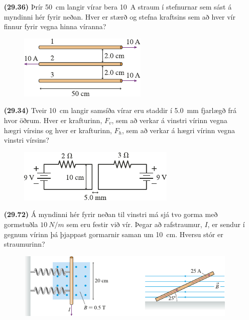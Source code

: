 \ifdefined \wholebook \else\documentclass[oneside]{book}\usepackage{EdlBook}\graphicspath{{figures/}}
\begin{document}
\begin{enumerate}[label = \textbf{(\alph*)}]

\item[\textbf{(29.36)}] Þrír \SI{50}{cm} langir vírar bera \SI{10}{A} straum í stefnurnar sem sást á myndinni hér fyrir neðan. Hver er stærð og stefna kraftsins sem að hver vír finnur fyrir vegna hinna víranna?

\begin{figure}[H]
    \centering
    \includegraphics[scale = 1.25]{figures/rk2936.pdf}
\end{figure}

\item[\textbf{(29.34)}] Tveir \SI{10}{cm} langir samsíða vírar eru staddir í \SI{5.0}{mm} fjarlægð frá hvor öðrum. Hver er krafturinn, $F_v$, sem að verkar á vinstri vírinn vegna hægri vírsins og hver er krafturinn, $F_h$, sem að verkar á hægri vírinn vegna vinstri vírsins? 

\begin{figure}[H]
    \centering
    \includegraphics[scale = 1.25]{figures/rk2934.pdf}
\end{figure}

\item[\textbf{(29.72)}] Á myndinni hér fyrir neðan til vinstri má sjá tvo gorma með gormstuðla $\SI{10}{N/m}$ sem eru festir við vír. Þegar að rafstraumur, $I$, er sendur í gegnum vírinn þá þjappast gormarnir saman um \SI{10}{cm}. Hversu stór er straumurinn? 

\begin{figure}[H]
    \centering
    \includegraphics[scale = 1.25]{figures/rk2973.pdf}
\end{figure}



\end{enumerate}
\end{document}
